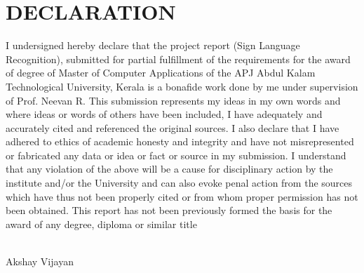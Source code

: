 \chapter*{\rm \large \bf DECLARATION}
\vspace{4.0mm}
\setlength{\parindent}{4em}
I undersigned hereby declare that the project report
(Sign Language Recognition), submitted for partial
fulfillment of the requirements for the award of degree of Master of Computer Applications
of the APJ Abdul Kalam Technological University, Kerala is a bonafide work done
by me under supervision of Prof. Neevan R. This submission represents my
ideas in my own words and where ideas or words of others have been included, I
have adequately and accurately cited and referenced the original sources. I also
declare that I have adhered to ethics of academic honesty and integrity and have
not misrepresented or fabricated any data or idea or fact or source in my
submission. I understand that any violation of the above will be a cause for
disciplinary action by the institute and/or the University and can also evoke
penal action from the sources which have thus not been properly cited or from
whom proper permission has not been obtained. This report has not been
previously formed the basis for the award of any degree, diploma or similar
title

\vspace{0.3 cm}

\\
\hfill {Akshay Vijayan}\\

\newpage 
